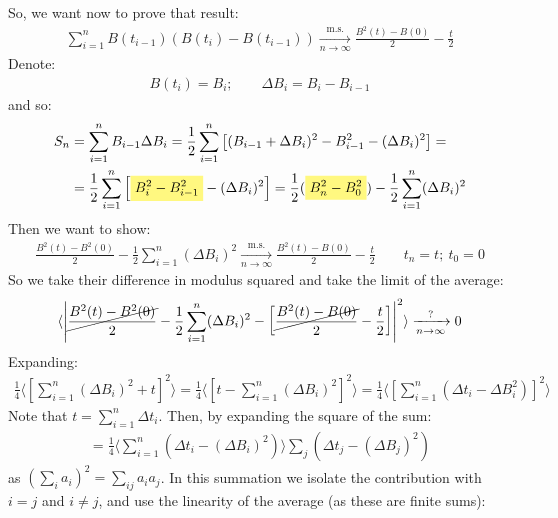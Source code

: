 \documentclass[../template.tex]{subfiles}
\begin{document}
\begin{example}[a]
    So, we want now to prove that result:
    \begin{align*}
        \sum_{i=1}^n B(t_{i-1}) (B(t_i) - B(t_{i-1}))  \xrightarrow[n \to \infty]{\mathrm{m.s.}} \frac{B^2(t)- B(0)}{2} - \frac{t}{2}    
    \end{align*}
    Denote:
    \begin{align*}
        B(t_i) = B_i; \qquad \Delta B_i = B_{i} - B_{i-1}
    \end{align*}
    and so:
    \begin{align*}
        S_n &= \sum_{i=1}^{n} B_{i-1} \Delta B_i = \frac{1}{2} \sum_{i=1}^{n} \left[(B_{i-1} + \Delta B_i)^2 - B_{i-1}^2 - (\Delta B_i)^2\right] = \\
        &= \frac{1}{2} \sum_{i=1}^{n} \left[\hlc{Yellow}{B_i^2 - B_{i-1}^2 }- (\Delta B_i)^2\right] = \frac{1}{2} (\hlc{Yellow}{B_n^2 - B_0^2}) - \frac{1}{2} \sum_{i=1}^n (\Delta B_i)^2  
    \end{align*}
    Then we want to show:
    \begin{align*}
        \frac{B^2(t) - B^2(0)}{2} - \frac{1}{2} \sum_{i=1}^n (\Delta B_i)^2  \xrightarrow[n \to \infty]{\mathrm{m.s.} } \frac{B^2(t)-B(0)}{2} - \frac{t}{2} \qquad t_n = t; \> t_0 = 0
    \end{align*}
    So we take their difference in modulus squared and take the limit of the average:
    \begin{align*}
       \langle \left| \cancel{\frac{B^2(t) - B^2(0)}{2} }- \frac{1}{2} \sum_{i=1}^n (\Delta B_i)^2 - \left[\cancel{\frac{B^2(t)-B(0)}{2}} - \frac{t}{2}  \right]   \right|^2 \rangle  \xrightarrow[n \to \infty]{?}  0
    \end{align*}
    Expanding:
    \begin{align*}
        \frac{1}{4} \langle \left[\sum_{i=1}^n (\Delta B_i)^2 + t \right]^2 \rangle = \frac{1}{4} \langle \left[t - \sum_{i=1}^n (\Delta B_i)^2 \right]^2 \rangle = \frac{1}{4} \langle \left[\sum_{i=1}^n (\Delta t_i - \Delta B_i^2)\right]^2 \rangle   
    \end{align*}
    Note that $t = \sum_{i=1}^n \Delta t_i $. Then, by expanding the square of the sum:
    \begin{align*}
        = \frac{1}{4} \langle \sum_{i=1}^n (\Delta t_i - (\Delta B_i)^2) \rangle \sum_j (\Delta t_j - (\Delta B_j)^2 ) 
    \end{align*} 
    as $\left( \sum_i a_i \right)^2 = \sum_{ij} a_i a_j$. In this summation we isolate the contribution with $i = j$ and $i \neq j$, and use the linearity of the average (as these are finite sums):

\end{example}
\end{document}
